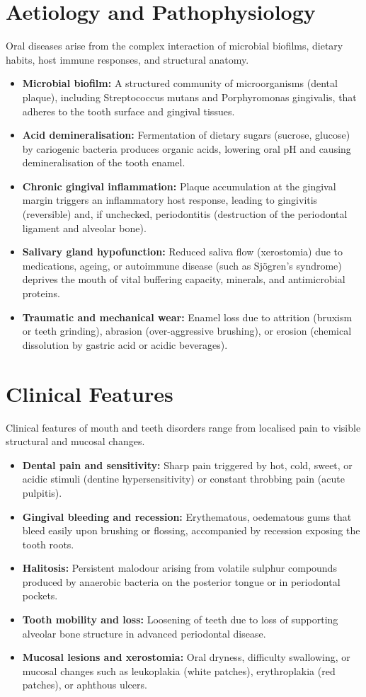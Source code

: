 \section*{Aetiology and Pathophysiology}
Oral diseases arise from the complex interaction of microbial biofilms, dietary habits, host immune responses, and structural anatomy.
\begin{itemize}
    \item \textbf{Microbial biofilm:} A structured community of microorganisms (dental plaque), including Streptococcus mutans and Porphyromonas gingivalis, that adheres to the tooth surface and gingival tissues.
    \item \textbf{Acid demineralisation:} Fermentation of dietary sugars (sucrose, glucose) by cariogenic bacteria produces organic acids, lowering oral pH and causing demineralisation of the tooth enamel.
    \item \textbf{Chronic gingival inflammation:} Plaque accumulation at the gingival margin triggers an inflammatory host response, leading to gingivitis (reversible) and, if unchecked, periodontitis (destruction of the periodontal ligament and alveolar bone).
    \item \textbf{Salivary gland hypofunction:} Reduced saliva flow (xerostomia) due to medications, ageing, or autoimmune disease (such as Sjögren's syndrome) deprives the mouth of vital buffering capacity, minerals, and antimicrobial proteins.
    \item \textbf{Traumatic and mechanical wear:} Enamel loss due to attrition (bruxism or teeth grinding), abrasion (over-aggressive brushing), or erosion (chemical dissolution by gastric acid or acidic beverages).
\end{itemize}

\section*{Clinical Features}
Clinical features of mouth and teeth disorders range from localised pain to visible structural and mucosal changes.
\begin{itemize}
    \item \textbf{Dental pain and sensitivity:} Sharp pain triggered by hot, cold, sweet, or acidic stimuli (dentine hypersensitivity) or constant throbbing pain (acute pulpitis).
    \item \textbf{Gingival bleeding and recession:} Erythematous, oedematous gums that bleed easily upon brushing or flossing, accompanied by recession exposing the tooth roots.
    \item \textbf{Halitosis:} Persistent malodour arising from volatile sulphur compounds produced by anaerobic bacteria on the posterior tongue or in periodontal pockets.
    \item \textbf{Tooth mobility and loss:} Loosening of teeth due to loss of supporting alveolar bone structure in advanced periodontal disease.
    \item \textbf{Mucosal lesions and xerostomia:} Oral dryness, difficulty swallowing, or mucosal changes such as leukoplakia (white patches), erythroplakia (red patches), or aphthous ulcers.
\end{itemize}

